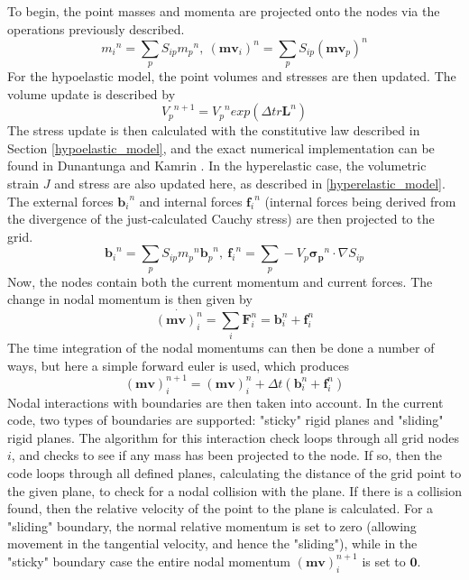 To begin, the point masses and momenta are projected onto the nodes via the operations previously described. 
\begin{equation}
{m_i}^n=\sum_pS_{ip}{m_p}^n,\ ({{\bm{mv}}_i})^n=\sum_pS_{ip}({{\bm{mv}}_p})^n\label{mass_and_mom_projection}
\end{equation}
For the hypoelastic model, the point volumes and stresses are then updated. The volume update is described by
\begin{equation}
{V_p}^{n+1}={V_p}^n exp(\Delta tr\bm{L}^n) \label{volume_update}
\end{equation}
The stress update is then calculated with the constitutive law described in Section \ref{hypoelastic_model}, and the exact numerical implementation can be found in Dunantunga and Kamrin \cite{Dunatunga:2015:Continuum}. In the hyperelastic case, the volumetric strain $J$ and stress are also updated here, as described in \ref{hyperelastic_model}.
The external forces ${\bm{b}_i}^n$ and internal forces ${\bm{f}_i}^n$ (internal forces being derived from the divergence of the just-calculated Cauchy stress) are then projected to the grid.
\begin{equation}
{\bm{b}_i}^n=\sum_pS_{ip}{m_p}^n{\bm{b}_p}^n,\ {\bm{f}_i}^n=\sum_p -V_p\bm{{\sigma}_p}^n \cdot \nabla S_{ip}
\label{force_projection}
\end{equation}
Now, the nodes contain both the current momentum and current forces. The change in nodal momentum is then given by
\begin{equation}
\dot{(\bm{mv})^n_i}=\sum_{i}\bm{F}^n_i=\bm{b}^n_i+\bm{f}^n_i\label{momentum_rate}
\end{equation}
The time integration of the nodal momentums can then be done a number of ways, but here a simple forward euler is used, which produces
\begin{equation}
(\bm{mv})^{n+1}_i=(\bm{mv})^n_i+\Delta t(\bm{b}^n_i+\bm{f}^n_i)
\end{equation}
Nodal interactions with boundaries are then taken into account. In the current code, two types of boundaries are supported: "sticky" rigid planes and "sliding" rigid planes. The algorithm for this interaction check loops through all grid nodes $i$, and checks to see if any mass has been projected to the node. If so, then the code loops through all defined planes, calculating the distance of the grid point to the given plane, to check for a nodal collision with the plane. If there is a collision found, then the relative velocity of the point to the plane is calculated. For a "sliding" boundary, the normal relative momentum is set to zero (allowing movement in the tangential velocity, and hence the "sliding"), while in the "sticky" boundary case the entire nodal momentum $(\bm{mv})^{n+1}_i$ is set to $\bm{0}$.


